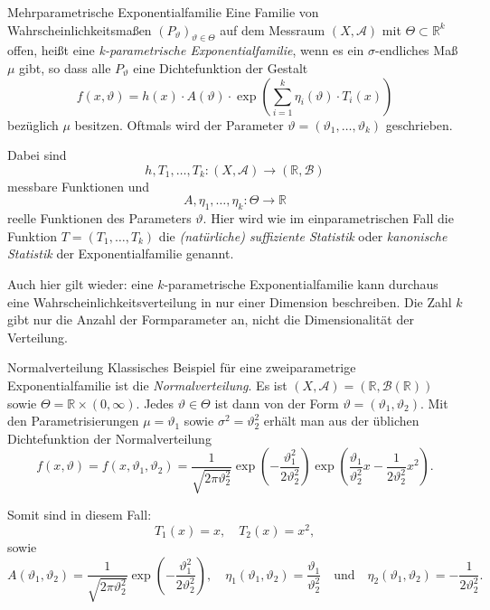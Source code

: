 \begin{defi}{Mehrparametrische Exponentialfamilie}
    Eine Familie von Wahrscheinlichkeitsmaßen $(P_{\vartheta})_{\vartheta \in \Theta}$ auf dem Messraum $(X, \mathcal{A})$ mit $\Theta \subset \mathbb{R}^k$ offen, heißt eine \emph{k-parametrische Exponentialfamilie}, wenn es ein $\sigma$-endliches Maß $\mu$ gibt, so dass alle $P_{\vartheta}$ eine Dichtefunktion der Gestalt
    \[
        f(x, \vartheta) = h(x) \cdot A(\vartheta) \cdot \exp \left( \sum_{i=1}^{k} \eta_i(\vartheta) \cdot T_i(x) \right)
    \]
    bezüglich $\mu$ besitzen.
    Oftmals wird der Parameter $\vartheta = (\vartheta_1, \dotsc, \vartheta_k)$ geschrieben.

    Dabei sind
    \[
        h, T_1, \dotsc, T_k: (X, \mathcal{A}) \to (\mathbb{R}, \mathcal{B})
    \]
    messbare Funktionen und
    \[
        A, \eta_1, \dotsc, \eta_k: \Theta \to \mathbb{R}
    \]
    reelle Funktionen des Parameters $\vartheta$.
    Hier wird wie im einparametrischen Fall die Funktion $T = (T_1, \dotsc, T_k)$ die \emph{(natürliche) suffiziente Statistik} oder \emph{kanonische Statistik} der Exponentialfamilie genannt.

    Auch hier gilt wieder: eine $k$-parametrische Exponentialfamilie kann durchaus eine Wahrscheinlichkeitsverteilung in nur einer Dimension beschreiben.
    Die Zahl $k$ gibt nur die Anzahl der Formparameter an, nicht die Dimensionalität der Verteilung.
\end{defi}

\begin{example}{Normalverteilung}
    Klassisches Beispiel für eine zweiparametrige Exponentialfamilie ist die \emph{Normalverteilung}.
    Es ist $(X, \mathcal{A}) = (\mathbb{R}, \mathcal{B}(\mathbb{R}))$ sowie $\Theta = \mathbb{R} \times (0, \infty)$.
    Jedes $\vartheta \in \Theta$ ist dann von der Form $\vartheta = (\vartheta_1, \vartheta_2)$.
    Mit den Parametrisierungen $\mu = \vartheta_1$ sowie $\sigma^2 = \vartheta_2^2$ erhält man aus der üblichen Dichtefunktion der Normalverteilung
    \[
        f(x, \vartheta) = f(x, \vartheta_1, \vartheta_2) = \frac{1}{\sqrt{2 \pi \vartheta_2^2}} \exp\left( -\frac{\vartheta_1^2}{2 \vartheta_2^2} \right) \exp\left( \frac{\vartheta_1}{\vartheta_2^2}x - \frac{1}{2 \vartheta_2^2}x^2 \right).
    \]

    Somit sind in diesem Fall:
    \[
        T_1(x) = x, \quad T_2(x) = x^2,
    \]
    sowie
    \[
        A(\vartheta_1, \vartheta_2) = \frac{1}{\sqrt{2 \pi \vartheta_2^2}} \exp\left( -\frac{\vartheta_1^2}{2 \vartheta_2^2} \right), \quad \eta_1(\vartheta_1, \vartheta_2) = \frac{\vartheta_1}{\vartheta_2^2} \quad \text{und} \quad \eta_2(\vartheta_1, \vartheta_2) = -\frac{1}{2 \vartheta_2^2}.
    \]
\end{example}

